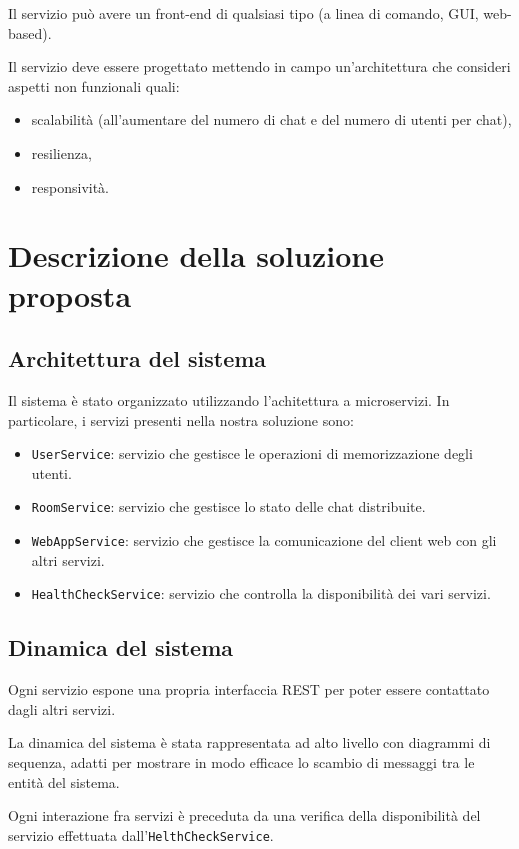 \documentclass[a4paper]{article}
\begin{document}
Il servizio può avere un front-end di qualsiasi tipo (a linea di comando, GUI, web-based).

Il servizio deve essere progettato mettendo in campo un'architettura che consideri aspetti non funzionali quali:
\begin{itemize}
    \item scalabilità (all'aumentare del numero di chat e del numero di utenti per chat),
    \item resilienza,
    \item responsività.
\end{itemize}

\section{Descrizione della soluzione proposta}\label{soluzione-proposta}

\subsection{Architettura del sistema}\label{architettura-del-sistema}
Il sistema è stato organizzato utilizzando l'achitettura a microservizi. In particolare, i servizi presenti nella nostra soluzione sono:
\begin{itemize}
    \item \texttt{UserService}: servizio che gestisce le operazioni di memorizzazione degli utenti.
    \item \texttt{RoomService}: servizio che gestisce lo stato delle chat distribuite.
   \item \texttt{WebAppService}: servizio che gestisce la comunicazione del client web con gli altri servizi.
   \item \texttt{HealthCheckService}: servizio che controlla la disponibilità dei vari servizi.
\end{itemize}
 
\subsection{Dinamica del sistema}\label{dinamica-del-sistema}
Ogni servizio espone una propria interfaccia REST per poter essere contattato dagli altri servizi.

La dinamica del sistema è stata rappresentata ad alto livello con diagrammi di sequenza, adatti per mostrare in modo efficace lo scambio di messaggi tra le entità del sistema.

Ogni interazione fra servizi è preceduta da una verifica della disponibilità del servizio effettuata dall'\texttt{HelthCheckService}.
\end{document}
